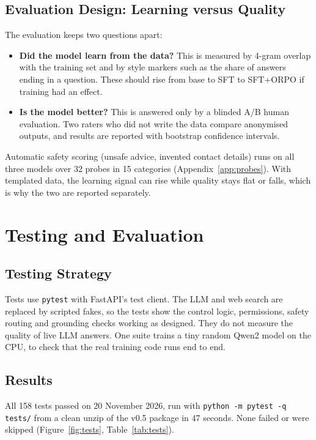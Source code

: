 \documentclass[11pt,a4paper]{article}
\newcommand{\code}[1]{\texttt{#1}}
\begin{document}
\subsection{Evaluation Design: Learning versus Quality}
The evaluation keeps two questions apart:
\begin{itemize}
  \item \textbf{Did the model learn from the data?} This is measured by 4-gram overlap with the training set and by style markers such as the share of answers ending in a question. These should rise from base to SFT to SFT+ORPO if training had an effect.
  \item \textbf{Is the model better?} This is answered only by a blinded A/B human evaluation. Two raters who did not write the data compare anonymised outputs, and results are reported with bootstrap confidence intervals.
\end{itemize}
Automatic safety scoring (unsafe advice, invented contact details) runs on all three models over 32
probes in 15 categories (Appendix~\ref{app:probes}). With templated data, the learning signal can rise
while quality stays flat or falls, which is why the two are reported separately.

\section{Testing and Evaluation}\label{sec:testing}

\subsection{Testing Strategy}
Tests use \code{pytest} with FastAPI's test client. The LLM and web search are replaced by scripted
fakes, so the tests show the control logic, permissions, safety routing and grounding checks
working as designed. They do not measure the quality of live LLM answers. One suite trains a tiny random
Qwen2 model on the CPU, to check that the real training code runs end to end.

\subsection{Results}
All 158 tests passed on 20 November 2026, run with \code{python -m pytest -q tests/} from a clean
unzip of the v0.5 package in 47 seconds. None failed or were skipped (Figure~\ref{fig:tests},
Table~\ref{tab:tests}).
\end{document}
